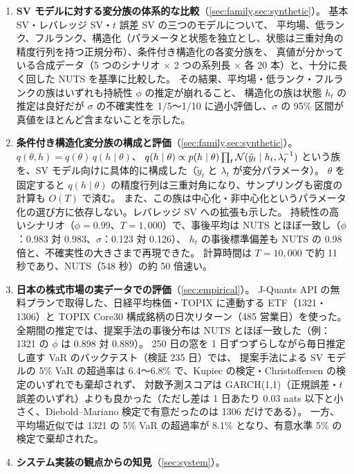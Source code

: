 \begin{enumerate}[label=(\roman*)]
  \item \textbf{SV モデルに対する変分族の体系的な比較}（\cref{sec:family,sec:synthetic}）。
    基本 SV・レバレッジ SV・$t$ 誤差 SV の三つのモデルについて、
    平均場、低ランク、フルランク、構造化（パラメータと状態を独立とし、状態は三重対角の精度行列を持つ正規分布）、条件付き構造化の各変分族を、
    真値が分かっている合成データ（5 つのシナリオ × 2 つの系列長 × 各 20 本）と、十分に長く回した NUTS を基準に比較した。
    その結果、平均場・低ランク・フルランクの族はいずれも持続性 $\phi$ の推定が崩れること、
    構造化の族は状態 $h_t$ の推定は良好だが $\sigma$ の不確実性を 1/5〜1/10 に過小評価し、$\sigma$ の 95\% 区間が真値をほとんど含まないことを示した。
  \item \textbf{条件付き構造化変分族の構成と評価}（\cref{sec:family,sec:synthetic}）。
    $q(\theta, h) = q(\theta)\, q(h \mid \theta)$、
    $q(h \mid \theta) \propto p(h \mid \theta) \prod_{t} \mathcal{N}(\tilde y_t \mid h_t, \lambda_t^{-1})$
    という族を、SV モデル向けに具体的に構成した（$\tilde y_t$ と $\lambda_t$ が変分パラメータ）。
    $\theta$ を固定すると $q(h \mid \theta)$ の精度行列は三重対角になり、サンプリングも密度の計算も $O(T)$ で済む。
    また、この族は中心化・非中心化というパラメータ化の選び方に依存しない。レバレッジ SV への拡張も示した。
    持続性の高いシナリオ（$\phi = 0.99$、$T = 1{,}000$）で、事後平均は NUTS とほぼ一致し（$\phi$：0.983 対 0.983、$\sigma$：0.123 対 0.126）、
    $h_t$ の事後標準偏差も NUTS の 0.98 倍と、不確実性の大きさまで再現できた。
    計算時間は $T = 10{,}000$ で約 11 秒であり、NUTS（548 秒）の約 50 倍速い。
  \item \textbf{日本の株式市場の実データでの評価}（\cref{sec:empirical}）。
    J-Quants API の無料プランで取得した、日経平均株価・TOPIX に連動する ETF（1321・1306）と TOPIX Core30 構成銘柄の日次リターン（485 営業日）を使った。
    全期間の推定では、提案手法の事後分布は NUTS とほぼ一致した（例：1321 の $\phi$ は 0.898 対 0.889）。
    250 日の窓を 1 日ずつずらしながら毎日推定し直す VaR のバックテスト（検証 235 日）では、
    提案手法による SV モデルの 5\% VaR の超過率は 6.4〜6.8\% で、Kupiec の検定・Christoffersen の検定のいずれでも棄却されず、
    対数予測スコアは GARCH(1,1)（正規誤差・$t$ 誤差のいずれ）よりも良かった（ただし差は 1 日あたり 0.03 nats 以下と小さく、Diebold–Mariano 検定で有意だったのは 1306 だけである）。
    一方、平均場近似では 1321 の 5\% VaR の超過率が 8.1\% となり、有意水準 5\% の検定で棄却された。
  \item \textbf{システム実装の観点からの知見}（\cref{sec:system}）。

\end{enumerate}
